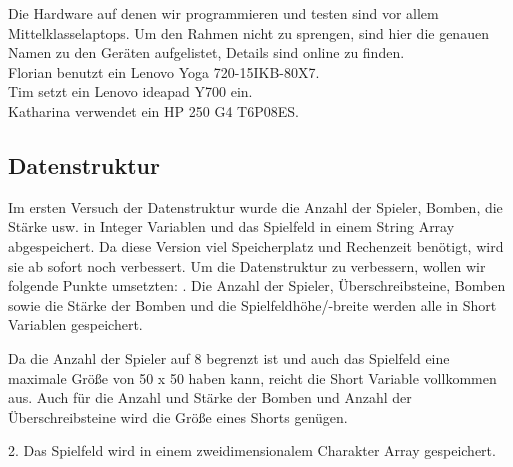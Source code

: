 \documentclass[12pt,a4paper,bibliography=totocnumbered,listof=totocnumbered]{scrartcl}
\begin{document}
    Die Hardware auf denen wir programmieren und testen sind vor allem \glqq Mittelklasselaptops\grqq. Um den Rahmen nicht zu sprengen, sind hier die genauen Namen zu den Geräten aufgelistet, Details sind online zu finden.\\
    Florian benutzt ein Lenovo Yoga 720-15IKB-80X7.\footnotemark\\

    Tim setzt ein Lenovo ideapad Y700 ein.\footnotemark\\
    Katharina verwendet ein HP 250 G4 T6P08ES.\footnotemark\\

	
	
	
	
	


    \subsection{Datenstruktur}
    \vspace{1em}
    Im ersten Versuch der Datenstruktur wurde die Anzahl der Spieler, Bomben, die Stärke usw. in Integer Variablen und das Spielfeld in einem String Array abgespeichert. Da diese Version viel Speicherplatz und Rechenzeit benötigt, wird sie ab sofort noch verbessert.
    Um die Datenstruktur zu verbessern, wollen wir folgende Punkte umsetzten:
    . Die Anzahl der Spieler, Überschreibsteine, Bomben sowie die Stärke der Bomben und die Spielfeldhöhe/-breite werden alle in Short Variablen gespeichert.

    Da die Anzahl der Spieler auf 8 begrenzt ist und auch das Spielfeld eine maximale Größe von 50 x 50 haben kann, reicht die Short Variable vollkommen aus. Auch für die Anzahl und Stärke der Bomben und Anzahl der Überschreibsteine wird die Größe eines Shorts genügen.

    2. Das Spielfeld wird in einem zweidimensionalem Charakter Array gespeichert.
\end{document}
